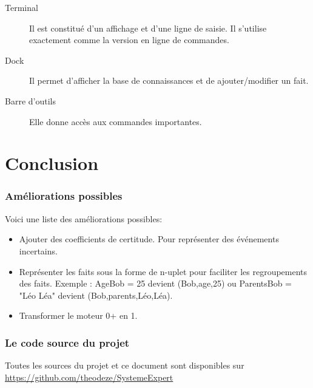 \documentclass[a4paper, 11pt]{article}
\begin{document}
\begin{description}
    \item[Terminal] Il est constitué d'un affichage et d'une ligne de saisie. Il s'utilise exactement comme la version en ligne de commandes.
    \item[Dock] Il permet d'afficher la base de connaissances et de ajouter/modifier un fait.
    \item[Barre d'outils] Elle donne accès aux commandes importantes.
\end{description}

\part{Conclusion}

\section{Améliorations possibles}

Voici une liste des améliorations possibles:

\begin{itemize}
    \item Ajouter des coefficients de certitude. Pour représenter des événements incertains.
    \item Représenter les faits sous la forme de n-uplet pour faciliter les regroupements des faits. Exemple : AgeBob = 25 devient (Bob,age,25) ou ParentsBob = "Léo Léa" devient (Bob,parents,Léo,Léa).
    \item Transformer le moteur 0+ en 1.
\end{itemize}

\section{Le code source du projet}

Toutes les sources du projet et ce document sont disponibles sur \url{https://github.com/theodeze/SystemeExpert}
\end{document}
